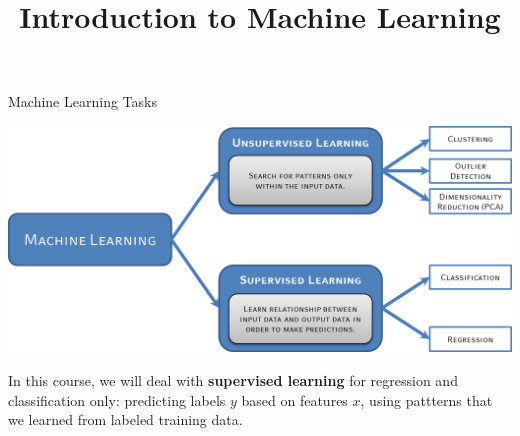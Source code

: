 


\title{Introduction to Machine Learning}
\date{}



\sloppy

\begin{frame}{Machine Learning Tasks}

\begin{center}
  \includegraphics[height=0.5\textheight]{figure_man/ml-types.png}
\end{center}

In this course, we will deal with \textbf{supervised learning} for regression and classification only: predicting labels $y$ based on features $x$, using pattterns that we learned from labeled training data.

\end{frame}

